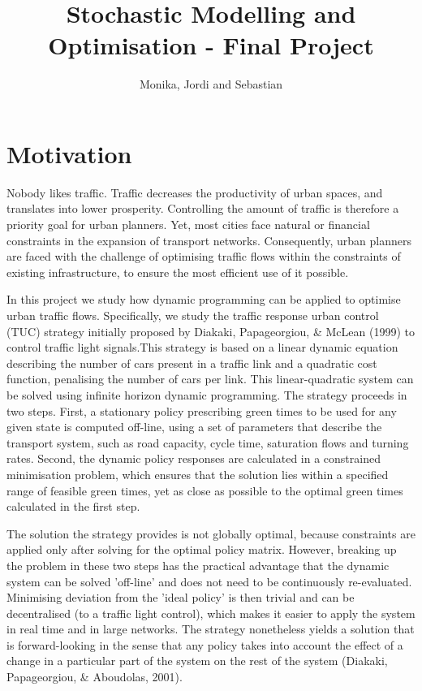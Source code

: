 \documentclass[11pt]{article}
\begin{document}
\author{Monika, Jordi and Sebastian}
\title{Stochastic Modelling and Optimisation - Final Project}
\maketitle

\medskip

\section{Motivation}
Nobody likes traffic. Traffic decreases the productivity of urban spaces, and translates into lower prosperity. Controlling the amount of traffic is therefore a priority goal for urban planners. Yet, most cities face natural or financial constraints in the expansion of transport networks. Consequently,  urban planners are faced with the challenge of optimising traffic flows within the constraints of existing infrastructure, to ensure the most efficient use of it possible.

In this project we study how dynamic programming can be applied to optimise urban traffic flows. Specifically, we study the traffic response urban control (TUC) strategy initially proposed by Diakaki, Papageorgiou, \& McLean (1999) to control traffic light signals.This strategy is based on a linear dynamic equation describing the number of cars present in a traffic link and a quadratic cost function, penalising the number of cars per link. This linear-quadratic system can be solved using infinite horizon dynamic programming. The strategy proceeds in two steps. First, a stationary policy prescribing green times to be used for any given state is computed off-line, using a set of parameters that describe the transport system, such as road capacity, cycle time, saturation flows and turning rates. Second, the dynamic policy responses are calculated in a constrained minimisation problem, which ensures that the solution lies within a specified range of feasible green times, yet as close as possible to the optimal green times calculated in the first step. 

The solution the strategy provides is not globally optimal, because constraints are applied only after solving for the optimal policy matrix. However, breaking up the problem in these two steps has the practical advantage that the dynamic system can be solved 'off-line' and does not need to be continuously re-evaluated. Minimising deviation from the 'ideal policy' is then trivial and can be decentralised (to a traffic light control), which makes it easier to apply the system in real time and in large networks. The strategy nonetheless yields a solution that is forward-looking in the sense that any policy takes into account the effect of a change in a particular part of the system on the rest of the system (Diakaki, Papageorgiou, \& Aboudolas, 2001).
\end{document}
